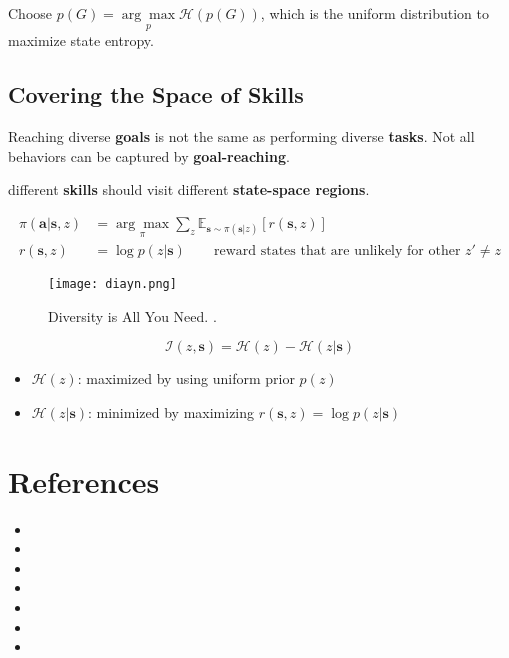  Choose $p(G) = \underset{p}{\arg\max} \mathcal{H}(p(G))$, which is the uniform distribution to maximize state entropy. \cite{hazan2019provably, gupta2018unsupervised}

\subsection{Covering the Space of Skills}
Reaching diverse \textbf{goals} is not the same as performing diverse \textbf{tasks}. Not all behaviors can be captured by \textbf{goal-reaching}. \cite{gregor2016variational, eysenbach2018diversity}

 different \textbf{skills} should visit different \textbf{state-space regions}.

\begin{align}
	\pi(\textbf{a|s}, z) &= \underset{\pi}{\arg\max} \sum_z \mathbb{E}_{\textbf{s} \sim \pi(\textbf{s}|z)} [r(\textbf{s}, z)]\\
	r(\textbf{s}, z) &= \log p(z|\textbf{s}) \qquad \text{reward states that are unlikely for other $z' \neq z$}
\end{align}

\begin{figure}[hbt!]
	\centering
	\texttt{[image: diayn.png]}
	\caption{Diversity is All You Need. \cite{eysenbach2018diversity}.}
\end{figure}

\begin{equation}
	\mathcal{I}(z,\textbf{s}) = \mathcal{H}(z) - \mathcal{H}(z|\textbf{s})
\end{equation}
\begin{itemize}
	\item $\mathcal{H}(z)$: maximized by using uniform prior $p(z)$
	\item $\mathcal{H}(z|\textbf{s})$: minimized by maximizing $r(\textbf{s}, z) = \log p(z|\textbf{s})$
\end{itemize}

\section{References}
\begin{itemize}
	\item {}
	\item {}
	\item {}
	\item {}
	\item {}
	\item {}
	\item {}
\end{itemize}